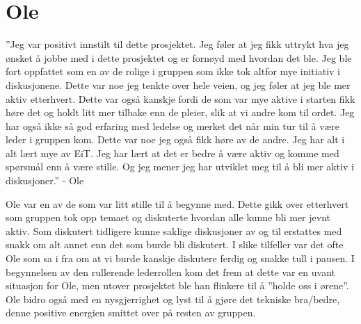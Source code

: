 \section{Ole}
''Jeg var positivt innstilt til dette prosjektet. 
Jeg føler at jeg fikk uttrykt hva jeg ønsket å jobbe med i dette prosjektet og er fornøyd med hvordan det ble.
Jeg ble fort oppfattet som en av de rolige i gruppen som ikke tok altfor mye initiativ i diskusjonene. 
Dette var noe jeg tenkte over hele veien, og jeg føler at jeg ble mer aktiv etterhvert. 
Dette var også kanskje fordi de som var mye aktive i starten fikk høre det og holdt litt mer tilbake enn de pleier, slik at vi andre kom til ordet.
Jeg har også ikke så god erfaring med ledelse og merket det når min tur til å være leder i gruppen kom. 
Dette var noe jeg også fikk høre av de andre.
Jeg har alt i alt lært mye av EiT. 
Jeg har lært at det er bedre å være aktiv og komme med spørsmål enn å være stille. 
Og jeg mener jeg har utviklet meg til å bli mer aktiv i diskusjoner.'' \hfill - Ole
\vspace{\secspace}

Ole var en av de som var litt stille til å begynne med. 
Dette gikk over etterhvert som gruppen tok opp temaet og diskuterte hvordan alle kunne bli mer jevnt aktiv. 
Som diskutert tidligere kunne saklige diskusjoner av og til erstattes med snakk om alt annet enn det som burde bli diskutert. 
I slike tilfeller var det ofte Ole som sa i fra om at vi burde kanskje diskutere ferdig og snakke tull i pausen. 
I begynnelsen av den rullerende lederrollen kom det frem at dette var en uvant situasjon for Ole, men utover prosjektet ble han flinkere til å ''holde oss i ørene''. 
Ole bidro også med en nysgjerrighet og lyst til å gjøre det tekniske bra/bedre, denne positive energien smittet over på resten av gruppen. 
